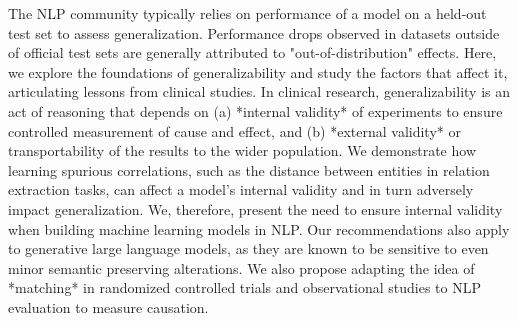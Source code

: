 The NLP community typically relies on performance of a model on a held-out test set to assess  generalization. Performance drops observed in datasets outside of official test sets are generally  attributed to "out-of-distribution" effects.  Here, we explore the foundations of generalizability and study the  factors that affect  it,  articulating  lessons from clinical studies. In clinical research,  generalizability is an act of reasoning that depends on  (a) *internal validity* of experiments to ensure controlled measurement of cause and effect, and (b) *external validity* or transportability of the results to the wider population. We demonstrate how learning spurious correlations, such as the distance between entities in  relation extraction tasks, can affect a model's internal validity and in turn adversely impact  generalization.  We, therefore, present the need to ensure internal validity when building machine learning models in  NLP. Our recommendations also apply to generative large language models, as they are  known to be sensitive   to even minor semantic preserving alterations. We also propose adapting the idea of *matching* in randomized controlled trials and observational studies to  NLP evaluation to measure causation.